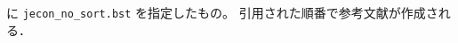 \documentclass[10pt]{jarticle}
\begin{document}
\verb|| に \verb|jecon_no_sort.bst| を指定したもの。
引用された順番で参考文献が作成される．
\vspace*{1em}\\



\nocite{*}



%

\end{document}
